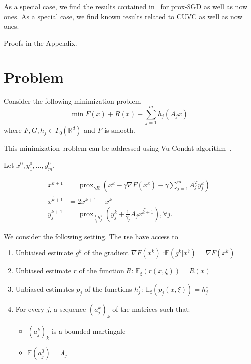\documentclass{article}
\DeclareMathOperator{\prox}{prox}
\newcommand{\bR}{{\mathbb R}}
\newcommand{\bE}{{\mathbb E}}
\theoremstyle{definition}
\begin{document}
As a special case, we find the results contained in~\cite{gorbunov2019unified} for prox-SGD as well as now ones. 
As a special case, we find known results related to CUVC as well as now ones.

Proofs in the Appendix.

\section{Problem}

Consider the following minimization problem
\begin{equation}
    \label{eq:pb-original}
    \min F(x) + R(x) + \sum_{j=1}^m h_j(A_j x)
\end{equation}
where $F,G,h_j \in \Gamma_0(\bR^d)$ and $F$ is smooth.

This minimization problem can be addressed using Vu-Condat algorithm~\cite{vu-condat}. 

Let $x^0,y_1^0,\ldots,y_m^0$.

\begin{align}
    \label{Vu-Condat}
    x^{k+1}   &= \prox_{\gamma R}(x^k - \gamma \nabla F(x^k) - \gamma \sum_{j=1}^m A_j^{T} y_j^k)\\
    \widetilde{x^{k+1}} &= 2x^{k+1} - x^k\\
    y_j^{k+1} &= \prox_{\frac{1}{\gamma_j} h_j^\star}(y_j^k + \frac{1}{\gamma_j}A_j\widetilde{x^{k+1}} ), \forall j.
\end{align}

We consider the following setting. The use have access to 

\begin{enumerate}
    \item Unbiaised estimate $g^{k}$ of the gradient $\nabla F(x^k)$ :$\bE(g^k|x^k) = \nabla F(x^k)$
    \item Unbiased estimate $r$ of the function $R$: $\bE_\xi(r(x,\xi)) = R(x)$ 
    \item Unbiased estimates $p_j$ of the functions $h_j^\star$: $\bE_\xi(p_j(x,\xi)) = h_j^\star$
    \item For every $j$, a sequence $(a_j^k)_k$ of the matrices such that: \begin{itemize}
                                                                                        \item $(a_j^k)_k$ is a bounded martingale
                                                                                        \item $\bE(a_j^0) = A_j$
    \end{itemize}
\end{enumerate}  
\end{document}
